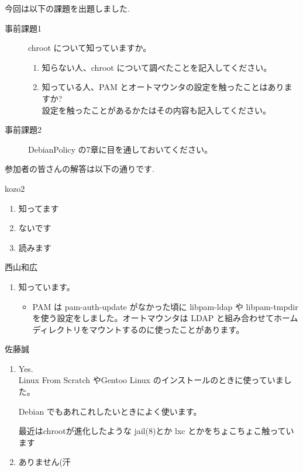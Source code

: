 \documentclass[mingoth,a4paper]{jsarticle}
\begin{document}
\clearpage


今回は以下の課題を出題しました.
\begin{screen}
  \begin{description}
  \item[事前課題1] chroot について知っていますか。
    \begin{enumerate}
    \item 知らない人、chroot について調べたことを記入してください。
    \item 知っている人、PAM とオートマウンタの設定を触ったことはありますか?\\
      設定を触ったことがあるかたはその内容も記入してください。
    \end{enumerate}
  \item[事前課題2] DebianPolicy の7章に目を通しておいてください。
  \end{description}
\end{screen}

参加者の皆さんの解答は以下の通りです.

\begin{prework}{ kozo2 }
 \begin{enumerate}
  \item 知ってます
  \item ないです
  \item 読みます
 \end{enumerate}
\end{prework}

\begin{prework}{ 西山和広 }
\begin{enumerate}
 \item 知っています。
       \begin{itemize}
        \item PAM は pam-auth-update がなかった頃に libpam-ldap や libpam-tmpdir を使う設定をしました。オートマウンタは LDAP と組み合わせてホームディレクトリをマウントするのに使ったことがあります。
       \end{itemize}
\end{enumerate}
\end{prework}

\begin{prework}{ 佐藤誠 }
 \begin{enumerate}
  \item Yes. \\
        Linux From Scratch やGentoo Linux 
        のインストールのときに使っていました。

        Debian でもあれこれしたいときによく使います。

        最近はchrootが進化したような jail(8)とか
        lxc とかをちょこちょこ触っています
  \item ありません(汗
 \end{enumerate}
\end{prework}
\end{document}
